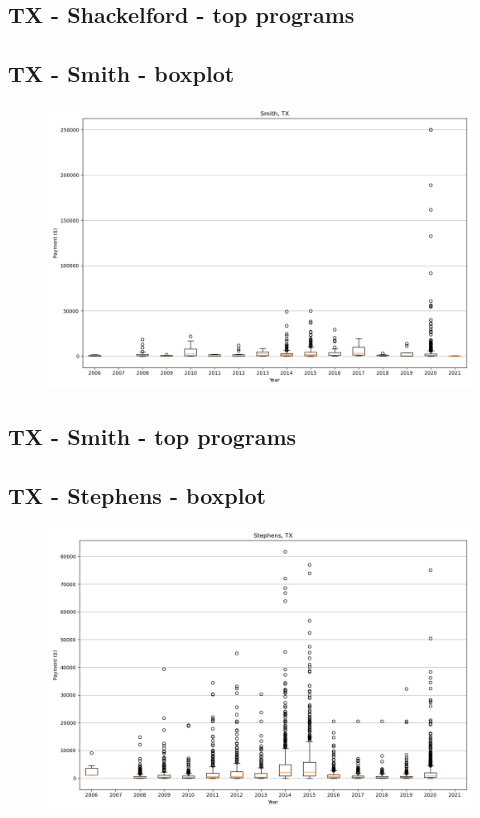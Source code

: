 \subsection*{TX - Shackelford - top programs}

\newpage
\subsection*{TX - Smith - boxplot}
\begin{figure}[h]
\centering
\includegraphics[width=7in]{../output/boxplots/counties/Smith-TX_boxplot.png}
\end{figure}


\subsection*{TX - Smith - top programs}

\newpage
\subsection*{TX - Stephens - boxplot}
\begin{figure}[h]
\centering
\includegraphics[width=7in]{../output/boxplots/counties/Stephens-TX_boxplot.png}
\end{figure}


